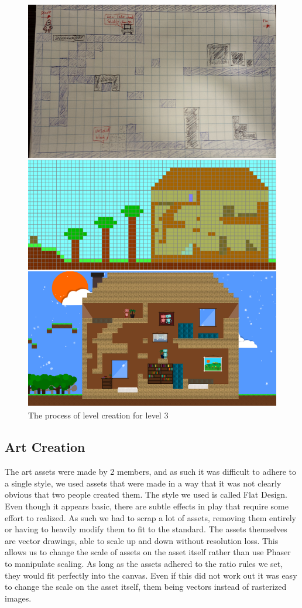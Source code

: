 \documentclass[a4paper,twoside,12pt]{article}
\begin{document}
\begin{figure}[h]
\includegraphics[scale=0.3]{levelSketchAndDesign.png}
\caption{The process of level creation for level 3}
\end{figure}

\subsection{Art Creation}
The art assets were made by 2 members, and as such it was difficult to adhere to a single style, we used assets that were made in a way that it was not clearly obvious that two people created them. The style we used is called Flat Design. Even though it appears basic, there are subtle effects in play that require some effort to realized. As such we had to scrap a lot of assets, removing them entirely or having to heavily modify them to fit to the standard. The assets themselves are vector drawings, able to scale up and down without resolution loss. This allows us to
change the scale of assets on the asset itself rather than use Phaser to manipulate scaling. As long as the assets adhered to the ratio rules we set, they would fit perfectly into the canvas. Even if this did not work out it was easy to change the scale on the asset itself, them being vectors instead of rasterized images.
\end{document}
